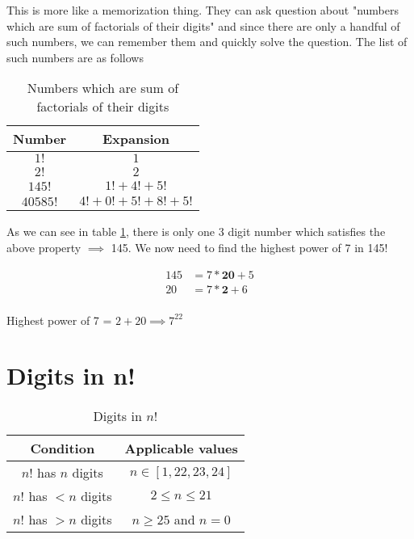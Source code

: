 This is more like a memorization thing. They can ask question about "numbers which are sum of factorials of their digits" and since there are only a handful of such numbers, we can remember them and quickly solve the question. The list of such numbers are as follows

\begin{table}[ht!]
    \centering
    \begin{tabular}{|| c | c ||}
         \hline
         Number & Expansion  \\
         \hline
         $1!$ & $1$ \\ 
         $2!$ & $2$ \\ 
         $145!$ & $1! + 4! + 5!$ \\ 
         $40585!$ & $4! + 0! + 5! + 8! + 5!$ \\ 
         \hline
    \end{tabular}
    \caption{Numbers which are sum of factorials of their digits}
    \label{table:num-sum-fact-digit}
\end{table}


As we can see in table \ref{table:num-sum-fact-digit}, there is only one 3 digit number which satisfies the above property $\implies$ 145. We now need to find the highest power of 7 in 145!

\begin{align*}
    145 &= 7 * \textbf{20} + 5 \\
    20 &= 7 * \textbf{2} + 6 \\
\end{align*}

Highest power of 7 = $2 + 20 \implies 7^{22}$

\section{Digits in n!}

\begin{table}[ht!]
    \centering
    \begin{tabular}{|| c | c ||}
        \hline
        \textbf{Condition} & \textbf{Applicable values}  \\
        \hline
        $n!$ has $n$ digits & $n \in [1,22,23,24]$ \\ 
        $n!$ has $< n$ digits & $2 \leq n \leq 21$ \\ 
        $n!$ has $> n$ digits & $n \geq 25$ and $n=0$ \\ 
        \hline
    \end{tabular}
    \caption{Digits in $n!$}
    \label{tab:n-and-num-of-digits}
\end{table}

